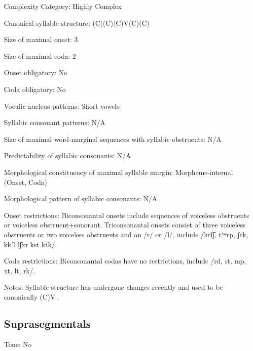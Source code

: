 {\begin{appendixdesc}
\item[Complexity Category:] Highly Complex

\item[Canonical syllable structure:] (C)(C)(C)V(C)(C) \citep[40--46]{Haspelmath1993}

\item[Size of maximal onset:] 3

\item[Size of maximal coda:] 2

\item[Onset obligatory:] No

\item[Coda obligatory:] No

\item[Vocalic nucleus patterns:] Short vowels

\item[Syllabic consonant patterns:] N/A

\item[Size of maximal word-marginal sequences with syllabic obstruents:] N/A

\item[Predictability of syllabic consonants:] N/A

\item[Morphological constituency of maximal syllable margin:] Morpheme-internal (Onset, Coda)

\item[Morphological pattern of syllabic consonants:] N/A

\item[Onset restrictions:] Biconsonantal onsets include sequences of voiceless obstruents or voiceless obstruent+sonorant. Triconsonantal onsets consist of three voiceless obstruents or two voiceless obstruents and an /r/ or /l/, include /krt͡ʃ, tʰʷrp, ʃtk, kk'l t͡ʃxr kst ktk/.

\item[Coda restrictions:] Biconsonantal codas have no restrictions, include /rd, st, mp, xt, lt, rk/.

\item[Notes:] Syllable structure has undergone changes recently and used to be canonically (C)V \citep[46]{Haspelmath1993}.
\end{appendixdesc}
\subsection*{Suprasegmentals}
\begin{appendixdesc}
\item[Tone:] No


\end{appendixdesc}}
